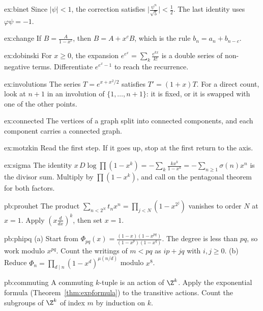 \begin{hint}{ex:binet}
Since $|\psi|<1$, the correction satisfies $\bigl|\frac{\psi^n}{\sqrt5}\bigr|<\frac12$. The last identity uses $\varphi\psi=-1$.
\end{hint}
\begin{hint}{ex:change}
If $B=\frac A{1-x^c}$, then $B=A+x^cB$, which is the rule $b_n=a_n+b_{n-c}$.
\end{hint}
\begin{hint}{ex:dobinski}
For $x\ge0$, the expansion $e^{e^x}=\sum_k\frac{e^{kx}}{k!}$ is a double series of non-negative terms. Differentiate
$e^{e^x-1}$ to reach the recurrence.
\end{hint}
\begin{hint}{ex:involutions}
The series $T=e^{x+x^2/2}$ satisfies $T'=(1+x)T$. For a direct count, look at $n+1$ in an involution of $\{1,\dots,n+1\}$: it is fixed, or it is swapped with one
of the other points.
\end{hint}
\begin{hint}{ex:connected}
The vertices of a graph split into connected components, and each component carries a connected graph.
\end{hint}
\begin{hint}{ex:motzkin}
Read the first step. If it goes up, stop at the first return to the axis.
\end{hint}
\begin{hint}{ex:sigma}
The identity $x\,D\log\prod(1-x^k)=-\sum_k\frac{kx^k}{1-x^k}=-\sum_{n\ge1}\sigma(n)x^n$ is the divisor sum. Multiply by $\prod(1-x^k)$, and call on the pentagonal theorem for both factors.
\end{hint}

\begin{hint}{pb:prouhet}
The product $\sum_{n<2^N}t_nx^n=\prod_{j<N}(1-x^{2^j})$ vanishes to order $N$ at $x=1$. Apply $(x\frac d{dx})^k$, then set $x=1$.
\end{hint}

\begin{hint}{pb:phipq}
(a) Start from $\Phi_{pq}(x)=\frac{(1-x)(1-x^{pq})}{(1-x^p)(1-x^q)}$. The degree is less than $pq$, so work modulo $x^{pq}$. Count the writings of $m<pq$ as $ip+jq$ with $i,j\ge0$. (b) Reduce $\Phi_n=\prod_{d\mid n}(1-x^d)^{\mu(n/d)}$ modulo $x^8$.
\end{hint}

\begin{hint}{pb:commuting}
A commuting $k$-tuple is an action of $\Z^k$. Apply the exponential formula (Theorem~\ref{thm:expformula}) to the transitive
actions. Count the subgroups of $\Z^k$ of index $m$ by induction on $k$.
\end{hint}

